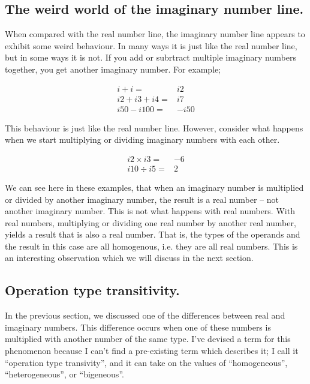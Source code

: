 \documentclass{article}
\begin{document}
\subsection{The weird world of the imaginary number line.}

When compared with the real number line, the imaginary number line appears to exhibit some weird behaviour. 
In many ways it is just like the real number line, but in some ways it is not. If you add or subrtract multiple imaginary numbers together, you get another imaginary number. For example;

\begin{align*}
i + i =& i2 \\
i2 + i3 + i4 =& i7 \\
i50 - i100 =& -i50 
\end{align*}

This behaviour is just like the real number line. However, consider what happens when we start multiplying or dividing
imaginary numbers with each other.

\begin{align*}
i2 \times i3 =& -6 \\
i10 \div i5 =& 2 
\end{align*}

We can see here in these examples, that when an imaginary number is multiplied or divided by another imaginary
number, the result is a real number -- not another imaginary number. This is not what happens with real numbers.
With real numbers, multiplying or dividing one real number by another real number, yields a result that is
also a real number. That is, the types of the operands and the result in this case are all homogenous, i.e. 
they are all real numbers. This is an interesting observation which we will discuss in the next section. 

\subsection{Operation type transitivity.}

In the previous section, we discussed one of the differences between real and imaginary numbers. This difference
occurs when one of these numbers is multiplied with another number of the same type. I've devised a term for this
phenomenon because I can't find a pre-existing term which describes it; I call it ``operation type transivity'', and
it can take on the values of ``homogeneous'', ``heterogeneous'', or ``bigeneous''.\\
\end{document}
